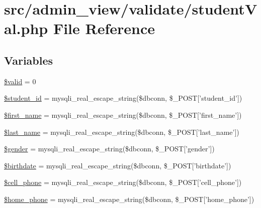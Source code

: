 \hypertarget{admin__view_2validate_2studentVal_8php}{\section{src/admin\-\_\-view/validate/student\-Val.php \-File \-Reference}
\label{admin__view_2validate_2studentVal_8php}
}
\subsection*{\-Variables}
\begin{DoxyCompactItemize}
\item 
\hyperlink{admin__view_2validate_2studentVal_8php_a0587674d27d00ef497e08e53ccf45bbb}{\$valid} = 0
\item 
\hyperlink{admin__view_2validate_2studentVal_8php_a70806170d1b60ef7fb76db46f2bce5e3}{\$student\-\_\-id} = mysqli\-\_\-real\-\_\-escape\-\_\-string(\$dbconn, \$\-\_\-\-P\-O\-S\-T\mbox{[}'student\-\_\-id'\mbox{]})
\item 
\hyperlink{admin__view_2validate_2studentVal_8php_ae0a75279f3627fb32311bc3352c89fe6}{\$first\-\_\-name} = mysqli\-\_\-real\-\_\-escape\-\_\-string(\$dbconn, \$\-\_\-\-P\-O\-S\-T\mbox{[}'first\-\_\-name'\mbox{]})
\item 
\hyperlink{admin__view_2validate_2studentVal_8php_a7aa024f049337e3bb2365d4007262847}{\$last\-\_\-name} = mysqli\-\_\-real\-\_\-escape\-\_\-string(\$dbconn, \$\-\_\-\-P\-O\-S\-T\mbox{[}'last\-\_\-name'\mbox{]})
\item 
\hyperlink{admin__view_2validate_2studentVal_8php_a0f1d7cfb9dc6f494b9014885205fc47e}{\$gender} = mysqli\-\_\-real\-\_\-escape\-\_\-string(\$dbconn, \$\-\_\-\-P\-O\-S\-T\mbox{[}'gender'\mbox{]})
\item 
\hyperlink{admin__view_2validate_2studentVal_8php_a1d5a040d6cd65b40daa47911e18adbb0}{\$birthdate} = mysqli\-\_\-real\-\_\-escape\-\_\-string(\$dbconn, \$\-\_\-\-P\-O\-S\-T\mbox{[}'birthdate'\mbox{]})
\item 
\hyperlink{admin__view_2validate_2studentVal_8php_a04f4e771f2239bf8a55f2ee7580a9609}{\$cell\-\_\-phone} = mysqli\-\_\-real\-\_\-escape\-\_\-string(\$dbconn, \$\-\_\-\-P\-O\-S\-T\mbox{[}'cell\-\_\-phone'\mbox{]})
\item 
\hyperlink{admin__view_2validate_2studentVal_8php_af8981335f6e9218851c725816b60158e}{\$home\-\_\-phone} = mysqli\-\_\-real\-\_\-escape\-\_\-string(\$dbconn, \$\-\_\-\-P\-O\-S\-T\mbox{[}'home\-\_\-phone'\mbox{]})

\end{DoxyCompactItemize}
